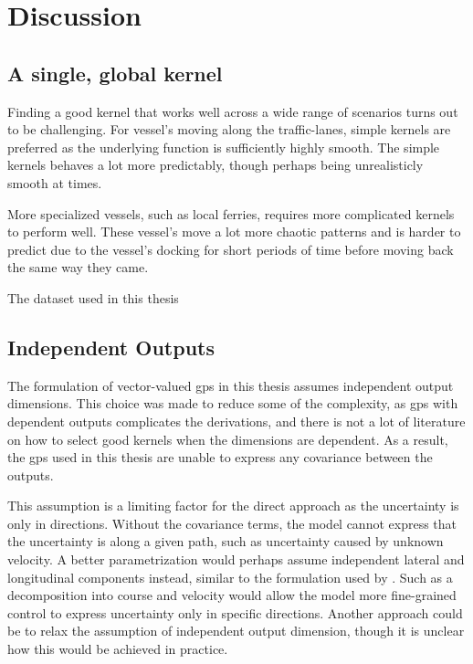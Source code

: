 \chapter{Discussion}\label{chap:discussion}


\section{A single, global kernel}
Finding a good kernel that works well across a wide range of scenarios turns out to be challenging. For vessel's moving along the traffic-lanes, simple kernels are preferred as the underlying function is sufficiently highly smooth. The simple kernels behaves a lot more predictably, though perhaps being unrealisticly smooth at times. 

More specialized vessels, such as local ferries, requires more complicated kernels to perform well. These vessel's move a lot more chaotic patterns and is harder to predict due to the vessel's docking for short periods of time before moving back the same way they came. 

The dataset used in this thesis

\section{Independent Outputs}

The formulation of vector-valued \acrshort{gp}s in this thesis assumes independent output dimensions. This choice was made to reduce some of the complexity, as \acrshort{gp}s with dependent outputs complicates the derivations, and there is not a lot of literature on how to select good kernels when the dimensions are dependent. As a result, the \acrshort{gp}s used in this thesis are unable to express any covariance between the outputs. 

This assumption is a limiting factor for the direct approach as the uncertainty is only in directions. Without the covariance terms, the model cannot express that the uncertainty is along a given path, such as uncertainty caused by unknown velocity. A better parametrization would perhaps assume independent lateral and longitudinal components instead, similar to the formulation used by \cite{gp_ais_trajectory}. Such as a decomposition into course and velocity would allow the model more fine-grained control to express uncertainty only in specific directions. Another approach could be to relax the assumption of independent output dimension, though it is unclear how this would be achieved in practice. 

